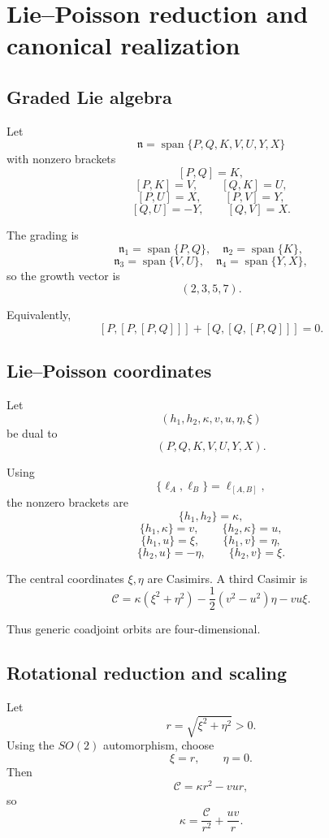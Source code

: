 \section{Lie--Poisson reduction and canonical realization}
\label{app:lie}

\subsection{Graded Lie algebra}

Let
\[
\mathfrak n
=
\operatorname{span}
\{P,Q,K,V,U,Y,X\}
\]
with nonzero brackets
\[
[P,Q]=K,
\]
\[
[P,K]=V,\qquad [Q,K]=U,
\]
\[
[P,U]=X,\qquad [P,V]=Y,
\]
\[
[Q,U]=-Y,\qquad [Q,V]=X.
\]

The grading is
\[
\mathfrak n_1=\operatorname{span}\{P,Q\},\quad
\mathfrak n_2=\operatorname{span}\{K\},
\]
\[
\mathfrak n_3=\operatorname{span}\{V,U\},\quad
\mathfrak n_4=\operatorname{span}\{Y,X\},
\]
so the growth vector is
\[
\boxed{(2,3,5,7).}
\]

Equivalently,
\[
[P,[P,[P,Q]]]+[Q,[Q,[P,Q]]]=0.
\]

\subsection{Lie--Poisson coordinates}

Let
\[
(h_1,h_2,\kappa,v,u,\eta,\xi)
\]
be dual to
\[
(P,Q,K,V,U,Y,X).
\]

Using
\[
\{\ell_A,\ell_B\}=\ell_{[A,B]},
\]
the nonzero brackets are
\[
\{h_1,h_2\}=\kappa,
\]
\[
\{h_1,\kappa\}=v,\qquad
\{h_2,\kappa\}=u,
\]
\[
\{h_1,u\}=\xi,\qquad
\{h_1,v\}=\eta,
\]
\[
\{h_2,u\}=-\eta,\qquad
\{h_2,v\}=\xi.
\]

The central coordinates \(\xi,\eta\) are Casimirs. A third Casimir is
\begin{equation}
\boxed{
\mathcal C
=
\kappa(\xi^2+\eta^2)
-\frac12(v^2-u^2)\eta
-vu\xi.
}
\label{eq:casimir}
\end{equation}

Thus generic coadjoint orbits are four-dimensional.

\subsection{Rotational reduction and scaling}

Let
\[
r=\sqrt{\xi^2+\eta^2}>0.
\]
Using the \(SO(2)\) automorphism, choose
\[
\xi=r,\qquad \eta=0.
\]
Then
\[
\mathcal C=\kappa r^2-vur,
\]
so
\[
\kappa=\frac{\mathcal C}{r^2}+\frac{uv}{r}.
\]

